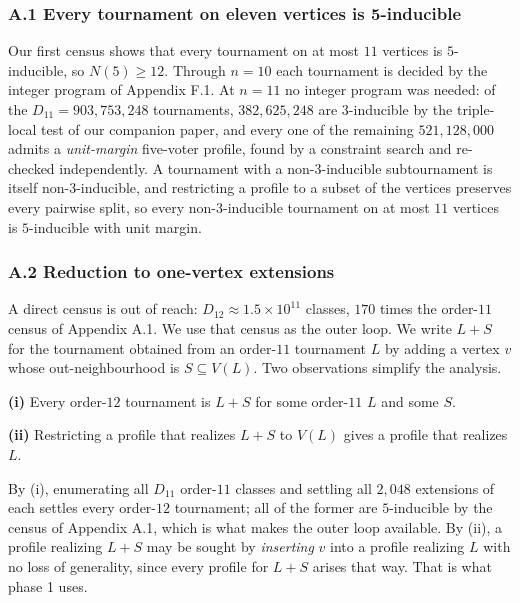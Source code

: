 \documentclass[
]{article}
\begin{document}
\subsubsection{A.1 Every tournament on eleven vertices is
5-inducible}\label{a.1-every-tournament-on-eleven-vertices-is-5-inducible}

Our first census shows that every tournament on at most \(11\) vertices
is \(5\)-inducible, so \(N(5) \ge 12\). Through \(n = 10\) each
tournament is decided by the integer program of Appendix F.1. At
\(n = 11\) no integer program was needed: of the
\(D_{11} = 903{,}753{,}248\) tournaments, \(382{,}625{,}248\) are
3-inducible by the triple-local test of our companion paper, and every
one of the remaining \(521{,}128{,}000\) admits a \emph{unit-margin}
five-voter profile, found by a constraint search and re-checked
independently. A tournament with a non-3-inducible subtournament is
itself non-3-inducible, and restricting a profile to a subset of the
vertices preserves every pairwise split, so every non-3-inducible
tournament on at most \(11\) vertices is \(5\)-inducible with unit
margin.

\subsubsection{A.2 Reduction to one-vertex
extensions}\label{a.2-reduction-to-one-vertex-extensions}

A direct census is out of reach: \(D_{12} \approx 1.5 \times 10^{11}\)
classes, \(170\) times the order-\(11\) census of Appendix A.1. We use
that census as the outer loop. We write \(L + S\) for the tournament
obtained from an order-\(11\) tournament \(L\) by adding a vertex \(v\)
whose out-neighbourhood is \(S \subseteq V(L)\). Two observations
simplify the analysis.

\textbf{(i)} Every order-\(12\) tournament is \(L + S\) for some
order-\(11\) \(L\) and some \(S\).

\textbf{(ii)} Restricting a profile that realizes \(L + S\) to \(V(L)\)
gives a profile that realizes \(L\).

By (i), enumerating all \(D_{11}\) order-\(11\) classes and settling all
\(2{,}048\) extensions of each settles every order-\(12\) tournament;
all of the former are \(5\)-inducible by the census of Appendix A.1,
which is what makes the outer loop available. By (ii), a profile
realizing \(L + S\) may be sought by \emph{inserting} \(v\) into a
profile realizing \(L\) with no loss of generality, since every profile
for \(L+S\) arises that way. That is what phase 1 uses.
\end{document}
